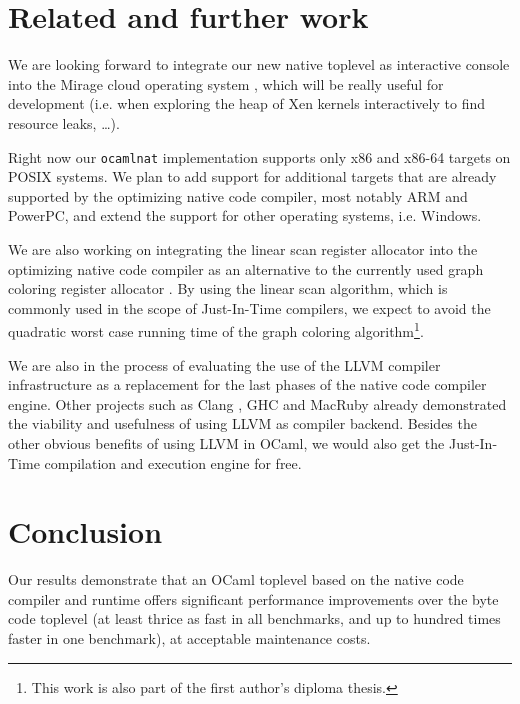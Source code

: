 \documentclass[10pt,a4paper,final,twocolumn]{article}
\makeatletter
\newcommand{\ie}{i.e.\@\xspace}
\makeatother
\begin{document}
\section{Related and further work} \label{section:Related_and_further_work}

We are looking forward to integrate our new native toplevel as interactive console
into the Mirage cloud operating system \cite{Mirage11,Madhavapeddy10,Madhavapeddy10hotcloud}, which
will be really useful for development (\ie when exploring the heap of Xen kernels interactively to
find resource leaks, \ldots).

Right now our \texttt{ocamlnat} implementation supports only x86 and x86-64 targets on POSIX systems.
We plan to add support for additional targets that are already supported by the optimizing native
code compiler, most notably ARM and PowerPC, and extend the support for other operating systems,
\ie Windows.

We are also working on integrating the linear scan register allocator \cite{PolettoS99,WimmerM05}
into the optimizing native code compiler as an alternative to the currently used graph coloring
register allocator \cite{Aho06}. By using the linear scan algorithm, which is commonly used in the
scope of Just-In-Time compilers, we expect to avoid the quadratic worst case running time of the
graph coloring algorithm\footnote{This work is also part of the first author's diploma thesis.}.

We are also in the process of evaluating the use of the LLVM compiler infrastructure
\cite{Lattner02,Lattner04,LLVM11} as a replacement
for the last phases of the native code compiler engine. Other projects such as Clang \cite{Clang11},
GHC \cite{Terei10} and MacRuby \cite{MacRuby11} already demonstrated the viability and usefulness of
using LLVM as compiler backend. Besides the other obvious benefits of using LLVM in OCaml, we would
also get the Just-In-Time compilation and execution engine for free.


\section{Conclusion} \label{section:Conclusion}

Our results demonstrate that an OCaml toplevel based on the native code compiler and runtime offers
significant performance improvements over the byte code toplevel (at least thrice as fast in all
benchmarks, and up to hundred times faster in one benchmark), at acceptable maintenance costs.
\end{document}
